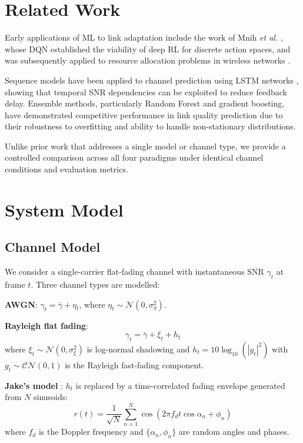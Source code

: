 \documentclass[conference]{IEEEtran}
\begin{document}
\section{Related Work}

Early applications of ML to link adaptation include the work of Mnih
\textit{et al.} \cite{mnih2015human}, whose DQN established the viability of
deep RL for discrete action spaces, and was subsequently applied to resource
allocation problems in wireless networks \cite{huang2020drl}.

Sequence models have been applied to channel prediction using LSTM
networks \cite{ye2018channel}, showing that temporal SNR dependencies can be
exploited to reduce feedback delay. Ensemble methods, particularly Random
Forest and gradient boosting, have demonstrated competitive performance in
link quality prediction \cite{kim2019ml} due to their robustness to overfitting
and ability to handle non-stationary distributions.

Unlike prior work that addresses a single model or channel type, we provide
a controlled comparison across all four paradigms under identical channel
conditions and evaluation metrics.

\section{System Model}

\subsection{Channel Model}

We consider a single-carrier flat-fading channel with instantaneous SNR
$\gamma_t$ at frame $t$. Three channel types are modelled:

\textbf{AWGN}: $\gamma_t = \bar{\gamma} + \eta_t$, where
$\eta_t \sim \mathcal{N}(0, \sigma_\eta^2)$.

\textbf{Rayleigh flat fading}:
\begin{equation}
  \gamma_t = \bar{\gamma} + \xi_t + h_t
\end{equation}
where $\xi_t \sim \mathcal{N}(0, \sigma_\xi^2)$ is log-normal shadowing and
$h_t = 10\log_{10}(|g_t|^2)$ with $g_t \sim \mathcal{CN}(0,1)$ is the
Rayleigh fast-fading component.

\textbf{Jake's model} \cite{jakes1974microwave}: $h_t$ is replaced by a
time-correlated fading envelope generated from $N$ sinusoids:
\begin{equation}
  r(t) = \frac{1}{\sqrt{N}} \sum_{n=1}^{N} \cos(2\pi f_d t \cos\alpha_n + \phi_n)
\end{equation}
where $f_d$ is the Doppler frequency and $\{\alpha_n, \phi_n\}$ are random
angles and phases.
\end{document}
